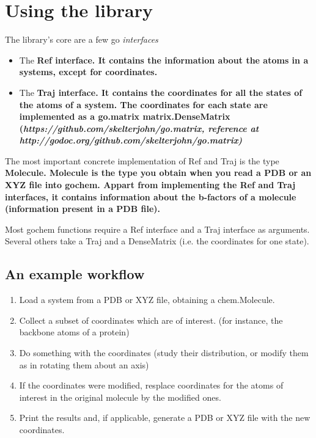 \documentclass{report}
\begin{document}
\section{Using the library}

The library's core are a few go \it{interfaces} 

\begin{itemize}
\item The \bf{Ref} interface. It contains the information about the atoms in a systems, except for coordinates.
\item The \bf{Traj} interface. It contains the coordinates for all the states of the atoms of a system. The coordinates for each state are implemented as a go.matrix matrix.DenseMatrix (\it{https://github.com/skelterjohn/go.matrix}, reference at \it{http://godoc.org/github.com/skelterjohn/go.matrix})
\end{itemize}

The most important concrete implementation of Ref and Traj is the type \bf{Molecule}. Molecule is the type you obtain when you read a PDB or an XYZ file into gochem. Appart from implementing the Ref and Traj interfaces, it contains information about the b-factors of a molecule (information present in a PDB file).

Most gochem functions require a Ref interface and a Traj interface as arguments. Several others take a Traj and a DenseMatrix (i.e. the coordinates for one state). 

\subsection{An example workflow}

\begin{enumerate}

\item Load a system from a PDB or XYZ file, obtaining a chem.Molecule.
\item Collect a subset of coordinates which are of interest. (for instance, the backbone atoms of a protein)
\item Do something with the coordinates (study their distribution, or modify them as in rotating them about an axis)
\item If the coordinates were modified, resplace coordinates for the atoms of interest in the original molecule by the modified ones.
\item Print the results and, if applicable, generate a PDB or XYZ file with the new coordinates.

\end{enumerate} 
\end{document}
